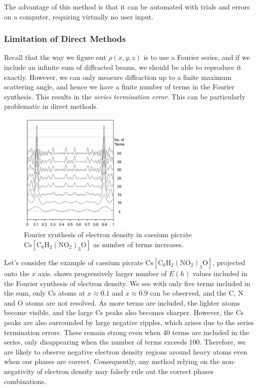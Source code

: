 \documentclass{article}
\theoremstyle{plain}\theoremheaderfont{\normalfont\itshape}\theorembodyfont{\rmfamily}\theoremseparator{.}\newtheorem*{rem}{Remark}\newtheorem*{ex}{Example}\newtheorem*{proof}{Proof}\newtheorem*{altp}{Alternative proof}
\theoremstyle{plain}\theoremheaderfont{\normalfont\bfseries}\theorembodyfont{\rmfamily}\theoremseparator{.}\newtheorem{thm}{Theorem}[section]\newtheorem{lem}[thm]{Lemma}\newtheorem{prop}[thm]{Proposition}\newtheorem*{cor}{Corollary}\newtheorem{defn}[thm]{Definition}\newtheorem{clm}[thm]{Claim}\newtheorem{clminproof}{Claim}\newtheorem*{law}{Law}\newtheorem{pos}[thm]{Postulate}
\theoremstyle{break}\theoremheaderfont{\normalfont\itshape}\theorembodyfont{\rmfamily}\theoremseparator{.\medskip}\newtheorem*{proofskip}{Proof}\newtheorem*{exs}{Examples}\newtheorem*{rems}{Remarks}
\theoremstyle{break}\theoremheaderfont{\normalfont\bfseries}\theorembodyfont{\rmfamily}\theoremseparator{.\medskip}\newtheorem{lemskip}[thm]{Lemma}\newtheorem{defnskip}[thm]{Definition}\newtheorem{propskip}[thm]{Proposition}\newtheorem{thmskip}[thm]{Theorem}
\numberwithin{equation}{section}
\begin{document}
    The advantage of this method is that it can be automated with trials and errors on a computer, requiring virtually no user input.

    \subsubsection{Limitation of Direct Methods}
    Recall that the way we figure out \(\rho(x,y,z)\) is to use a Fourier series, and if we include an infinite sum of diffracted beams, we should be able to reproduce it exactly. However, we can only measure diffraction up to a finite maximum scattering angle, and hence we have a finite number of terms in the Fourier synthesis. This results in the \textit{series termination error}. This can be particularly problematic in direct methods.

    \begin{figure}
        \centering
        \includegraphics[width=0.5\textwidth]{Termination_error.png}
        \caption{Fourier synthesis of electron density in caesium picrate \(\mathrm{Cs[C_6H_2(NO_2)_3O]}\) as number of terms increases.}
        \label{Fig:Termination_error}
    \end{figure}

    Let's consider the example of caesium picrate \(\mathrm{Cs[C_6H_2(NO_2)_3O]}\), projected onto the \(x\) axis.  shows progressively larger number of \(E(h)\) values included in the Fourier synthesis of electron density. We see with only five terms included in the sum, only Cs atoms at \(x\approx 0.1\) and \(x\approx 0.9\) can be observed, and the C, N and O atoms are not resolved. As more terms are included, the lighter atoms become visible, and the large Cs peaks also becomes sharper. However, the Cs peaks are also surrounded by large negative ripples, which arises due to the series termination errors. These remain strong even when 40 terms are included in the series, only disappearing when the number of terms exceeds 100. Therefore, we are likely to observe negative electron density regions around heavy atoms even when our phases are correct. Consequently, any method relying on the non-negativity of electron density may falsely rule out the correct phases combinations.
\end{document}
